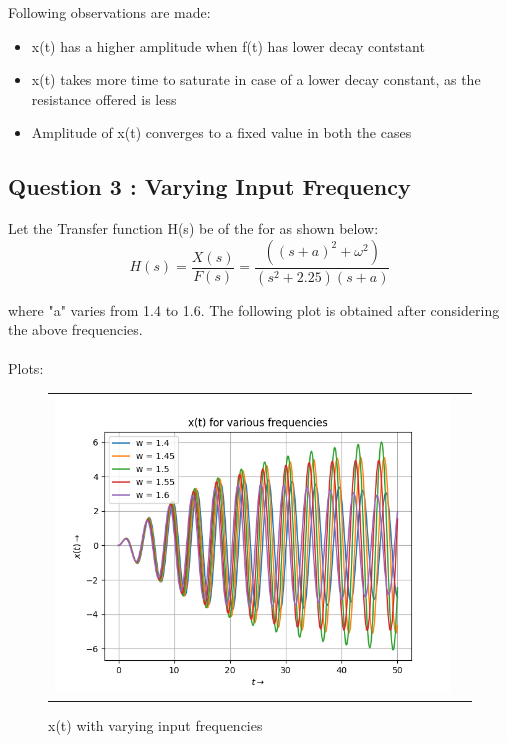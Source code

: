 \documentclass[11pt, a4paper]{article}
\begin{document}
	 Following observations are made:	
            \begin{itemize}
	    \item
	    x(t) has a higher amplitude when f(t) has lower decay contstant 
	    \item
	    x(t) takes more time to saturate in case of a lower decay constant, as the resistance offered is less
	    \item
	    Amplitude of x(t) converges to a fixed value in both the cases
	    \end{itemize}
    				
        \subsection{Question 3 : Varying Input Frequency}
 	
    	Let the Transfer function H(s) be of the for as shown below:
    	\begin{equation}
    	  H(s) =  \frac{X(s)}{F(s)} = \frac{((s+a)^2+\omega^2)}{(s^2+2.25)(s+a)}
    	\end{equation}

	where "a" varies from 1.4 to 1.6.
	The following plot is obtained after considering the above frequencies.\\
	\\Plots:
	       \begin{figure}[H]
                    \centering
                    \setlength\tabcolsep{2pt}
                    \begin{tabular}{cc}
                       \includegraphics[scale=0.9]{Figure 3.png}
                    \end{tabular}
                    \caption{x(t) with varying input frequencies} 
                \end{figure}
\end{document}
